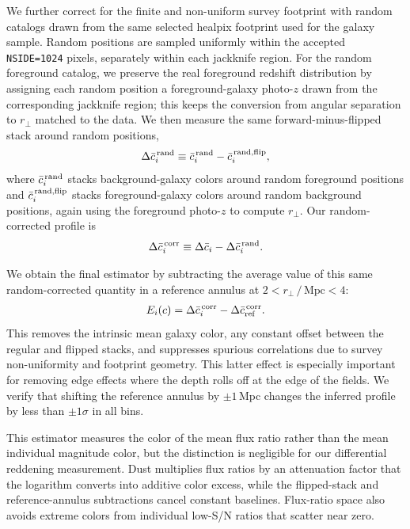 \documentclass[linenumbers, twocolumn]{aastex701}
\begin{document}
We further correct for the finite and non-uniform survey footprint with random catalogs drawn from the same selected healpix footprint used for the galaxy sample.
Random positions are sampled uniformly within the accepted \texttt{NSIDE=1024} pixels, separately within each jackknife region.
For the random foreground catalog, we preserve the real foreground redshift distribution by assigning each random position a foreground-galaxy photo-$z$ drawn from the corresponding jackknife region; this keeps the conversion from angular separation to $r_\perp$ matched to the data.
We then measure the same forward-minus-flipped stack around random positions,
\begin{align}
    \Delta \bar c^\text{\,rand}_i
    \equiv \bar{c}^\text{\,rand}_i
    - \bar{c}^{\text{\,rand,flip}}_i ,
\end{align}
where $\bar{c}^\text{\,rand}_i$ stacks background-galaxy colors around random foreground positions and $\bar{c}^{\text{\,rand,flip}}_i$ stacks foreground-galaxy colors around random background positions, again using the foreground photo-$z$ to compute $r_\perp$.
Our random-corrected profile is
\begin{align}
    \Delta \bar c^\text{\,corr}_i
    \equiv
    \Delta \bar c_i - \Delta \bar c^\text{\,rand}_i .
\end{align}

We obtain the final estimator by subtracting the average value of this same random-corrected quantity in a reference annulus at $2 < r_\perp\,/\,\text{Mpc} < 4$:
\begin{align}
    E_i(c) =
    \Delta \bar c^\text{\,corr}_i
    - \Delta \bar c^\text{\,corr}_\text{ref}.
\end{align}
This removes the intrinsic mean galaxy color, any constant offset between the regular and flipped stacks, and suppresses spurious correlations due to survey non-uniformity and footprint geometry.
This latter effect is especially important for removing edge effects where the depth rolls off at the edge of the fields.
We verify that shifting the reference annulus by $\pm 1$\,Mpc changes the inferred profile by less than $\pm1\sigma$ in all bins.

This estimator measures the color of the mean flux ratio rather than the mean individual magnitude color, but the distinction is negligible for our differential reddening measurement.
Dust multiplies flux ratios by an attenuation factor that the logarithm converts into additive color excess, while the flipped-stack and reference-annulus subtractions cancel constant baselines.
Flux-ratio space also avoids extreme colors from individual low-S/N ratios that scatter near zero.
\end{document}
